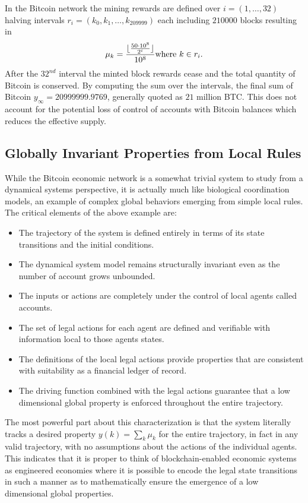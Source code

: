\documentclass[letterpaper, 10 pt, conference]{ieeeconf}  %
\begin{document}
In the Bitcoin network the mining rewards are defined over $i=(1,\ldots,32)$ halving intervals $r_i=(k_0,k_1,\ldots,k_{209999})$ each including $210000$ blocks resulting in
\begin{equation}
    \mu_k = \frac{\lfloor{\frac{50 \cdot 10^8}{2^i}}\rfloor}{10^8} \hbox{where $k\in r_i$.}
\end{equation}
 After the $32^{nd}$ interval the minted block rewards cease and the total quantity of Bitcoin is conserved. By computing the sum over the intervals, the final sum of Bitcoin
$y_\infty = 20999999.9769$, generally quoted as $21$ million BTC. This does not account for the potential loss of control of accounts with Bitcoin balances which reduces the effective supply.

\subsection{Globally Invariant Properties from Local Rules}
%
%
While the Bitcoin economic network is a somewhat trivial system to study from a dynamical systems perspective, it is actually much like biological coordination models, an example of complex global behaviors emerging from simple local rules. The critical elements of the above example are: 
\begin{itemize}
\item The trajectory of the system is defined entirely in terms of its state transitions and the initial conditions.
\item The dynamical system model remains structurally invariant even as the number of account grows unbounded.
\item The inputs or actions are completely under the control of local agents called accounts.
\item The set of legal actions for each agent are defined and verifiable with information local to those agents states.
\item The definitions of the local legal actions provide properties that are consistent with suitability as a financial ledger of record.
\item The driving function combined with the legal actions guarantee that a low dimensional global property is enforced throughout the entire trajectory.
\end{itemize}

The most powerful part about this characterization is that the system literally tracks a desired property $y(k) = \sum_k \mu_k$ for the entire trajectory, in fact in any valid trajectory, with no assumptions about the actions of the individual agents. This indicates that it is proper to think of blockchain-enabled economic systems as engineered economies where it is possible to encode the legal state transitions in such a manner as to mathematically ensure the emergence of a low dimensional global properties.
\end{document}
